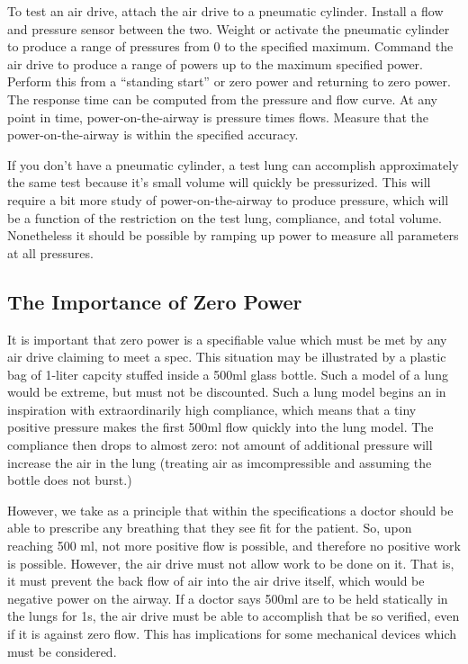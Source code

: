 \documentclass[conference]{article}
\begin{document}
To test an air drive, attach the air drive to a pneumatic cylinder. Install a flow
and pressure sensor between the two. Weight or activate the pneumatic cylinder
to produce a range of pressures from 0 to the specified maximum. Command the air drive
to produce a range of powers up to the maximum specified power. Perform this
from a ``standing start'' or zero power and returning to zero power. The response time
can be computed from the pressure and flow curve. At any point in time, power-on-the-airway
is pressure times flows. Measure that the power-on-the-airway is within the specified
accuracy.

If you don't have a pneumatic cylinder, a test lung can accomplish approximately the
same test because it's small volume will quickly be pressurized. This will require
a bit more study of power-on-the-airway to produce pressure, which will be a function
of the restriction on the test lung, compliance, and total volume. Nonetheless it should
be possible by ramping up power to measure all parameters at all pressures.

\subsection{The Importance of Zero Power}

It is important that zero power is a specifiable value which must be met by any
air drive claiming to meet a spec. This situation may be illustrated by a plastic
bag of 1-liter capcity stuffed inside a 500ml glass bottle. Such a model of a lung
would be extreme, but must not be discounted. Such a lung model begins an in
inspiration with extraordinarily
high compliance, which means that a tiny positive pressure makes the first 500ml flow
quickly into the lung model. The compliance then drops to almost zero: not amount of
additional pressure will increase the air in the lung (treating air as imcompressible
and assuming the bottle does not burst.)

However, we take as a principle that within the specifications a doctor should be able
to prescribe any breathing that they see fit for the patient. So, upon reaching 500 ml,
not more positive flow is possible, and therefore no positive work is possible. However,
the air drive must not allow work to be done on it. That is, it must prevent the
back flow of air into the air drive itself, which would be negative power on the airway.
If a doctor says 500ml are to be held statically in the lungs for 1s, the air drive
must be able to accomplish that be so verified, even if it is against zero flow.
This has implications for some mechanical devices which must be considered.
\end{document}
